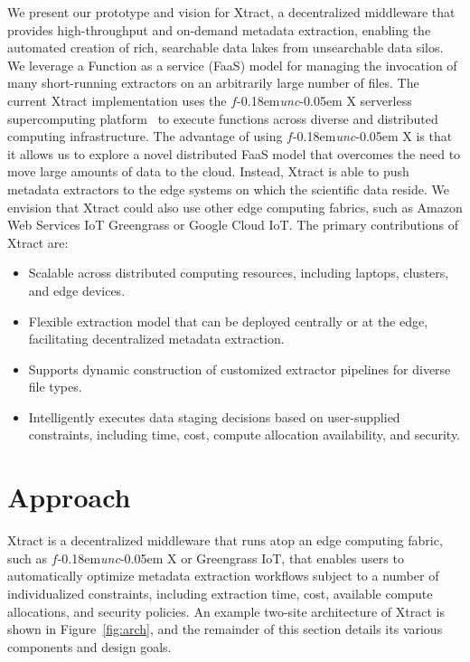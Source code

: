 \documentclass[sigconf, 9pt]{acmart}
\newcommand{\name}{Xtract}
\newcommand{\funcx}{$f$\kern-0.18em\emph{unc}\kern-0.05em X}
\begin{document}
We present our prototype and vision for \name{},
a decentralized middleware that provides high-throughput and on-demand metadata 
extraction, enabling the automated creation of rich, searchable data lakes from unsearchable data silos. 
We leverage a Function as a service (FaaS) model for managing the invocation of
many short-running extractors on an arbitrarily large number of files. 
The current \name{} implementation uses the \funcx{} serverless supercomputing platform~\cite{chard2019serverless}
to execute functions across diverse and distributed computing infrastructure.  
The advantage of using \funcx{} is that it allows us to explore a novel distributed FaaS model 
that overcomes the need to move large amounts of data to the cloud. 
Instead, \name{} is able to push
metadata extractors to the edge systems on which the scientific data reside. 
We envision that \name{} could also use other edge computing fabrics, 
such as Amazon Web Services IoT Greengrass or Google Cloud IoT. 
The primary contributions of \name{} are: 
\begin{itemize}
\item Scalable across distributed computing resources, including laptops, clusters, and edge devices.
\item Flexible extraction model that can be deployed centrally or at the edge, facilitating decentralized metadata extraction.
\item Supports dynamic construction of customized extractor pipelines for diverse file types. 
\item Intelligently executes data staging decisions based on user-supplied constraints, including time, cost, compute allocation availability, and security. 
\end{itemize}


\section{Approach}
\label{sec:approach}

\name{} is a decentralized middleware that runs atop an edge computing fabric, such as \funcx{} or Greengrass IoT, that 
enables users to automatically optimize metadata extraction workflows subject to 
a number of individualized constraints, including extraction time, cost, available compute allocations, and security policies. 
An example two-site architecture of \name{} is shown in Figure~\ref{fig:arch}, and the remainder of this section 
details its various components and design goals.
\end{document}
